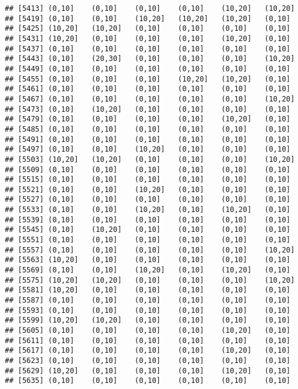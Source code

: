 \documentclass[]{article}
\begin{document}
\begin{verbatim}
## [5413] (0,10]    (0,10]    (0,10]    (0,10]    (10,20]   (10,20]  
## [5419] (0,10]    (0,10]    (10,20]   (10,20]   (10,20]   (0,10]   
## [5425] (10,20]   (10,20]   (0,10]    (0,10]    (0,10]    (0,10]   
## [5431] (10,20]   (0,10]    (0,10]    (0,10]    (10,20]   (0,10]   
## [5437] (0,10]    (0,10]    (0,10]    (0,10]    (0,10]    (0,10]   
## [5443] (0,10]    (20,30]   (0,10]    (0,10]    (0,10]    (10,20]  
## [5449] (0,10]    (0,10]    (0,10]    (0,10]    (0,10]    (0,10]   
## [5455] (0,10]    (0,10]    (0,10]    (10,20]   (10,20]   (0,10]   
## [5461] (0,10]    (0,10]    (0,10]    (0,10]    (0,10]    (0,10]   
## [5467] (0,10]    (0,10]    (0,10]    (0,10]    (0,10]    (10,20]  
## [5473] (0,10]    (10,20]   (0,10]    (0,10]    (0,10]    (0,10]   
## [5479] (0,10]    (0,10]    (0,10]    (0,10]    (10,20]   (0,10]   
## [5485] (0,10]    (0,10]    (0,10]    (0,10]    (0,10]    (0,10]   
## [5491] (0,10]    (0,10]    (0,10]    (0,10]    (0,10]    (0,10]   
## [5497] (0,10]    (0,10]    (10,20]   (0,10]    (0,10]    (0,10]   
## [5503] (10,20]   (10,20]   (0,10]    (0,10]    (0,10]    (10,20]  
## [5509] (0,10]    (0,10]    (0,10]    (0,10]    (0,10]    (0,10]   
## [5515] (0,10]    (0,10]    (0,10]    (0,10]    (0,10]    (0,10]   
## [5521] (0,10]    (0,10]    (10,20]   (0,10]    (0,10]    (0,10]   
## [5527] (0,10]    (0,10]    (0,10]    (0,10]    (0,10]    (0,10]   
## [5533] (0,10]    (0,10]    (10,20]   (0,10]    (10,20]   (0,10]   
## [5539] (0,10]    (0,10]    (0,10]    (0,10]    (0,10]    (0,10]   
## [5545] (0,10]    (10,20]   (0,10]    (0,10]    (0,10]    (0,10]   
## [5551] (0,10]    (0,10]    (0,10]    (0,10]    (0,10]    (0,10]   
## [5557] (0,10]    (0,10]    (0,10]    (0,10]    (0,10]    (10,20]  
## [5563] (10,20]   (0,10]    (0,10]    (0,10]    (0,10]    (0,10]   
## [5569] (0,10]    (0,10]    (10,20]   (0,10]    (10,20]   (0,10]   
## [5575] (10,20]   (10,20]   (0,10]    (0,10]    (0,10]    (10,20]  
## [5581] (10,20]   (0,10]    (0,10]    (0,10]    (0,10]    (0,10]   
## [5587] (0,10]    (0,10]    (0,10]    (0,10]    (0,10]    (0,10]   
## [5593] (0,10]    (0,10]    (0,10]    (0,10]    (0,10]    (0,10]   
## [5599] (10,20]   (10,20]   (0,10]    (0,10]    (0,10]    (0,10]   
## [5605] (0,10]    (0,10]    (0,10]    (0,10]    (10,20]   (0,10]   
## [5611] (0,10]    (0,10]    (0,10]    (0,10]    (0,10]    (0,10]   
## [5617] (0,10]    (0,10]    (0,10]    (0,10]    (10,20]   (0,10]   
## [5623] (0,10]    (0,10]    (0,10]    (0,10]    (0,10]    (0,10]   
## [5629] (10,20]   (0,10]    (0,10]    (0,10]    (10,20]   (0,10]   
## [5635] (0,10]    (0,10]    (0,10]    (0,10]    (0,10]    (0,10]   

\end{verbatim}
\end{document}

